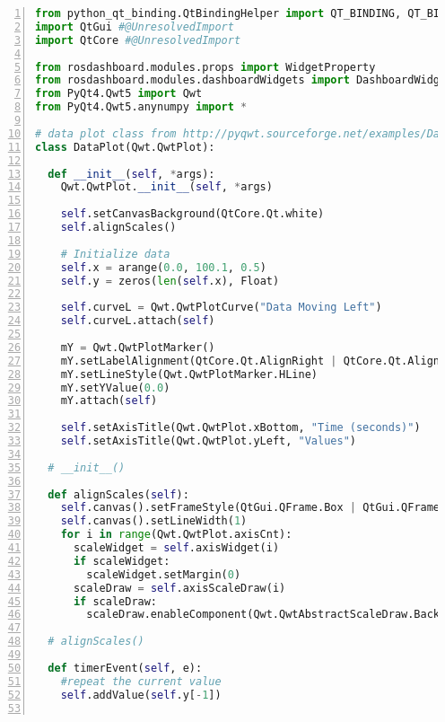 



\pagebreak
{}


\begin{lstlisting}[frame=single,caption={DragPlot implementation.},label=drag_plot_implementation,language=Python,numbers=left,breaklines=true]
from python_qt_binding.QtBindingHelper import QT_BINDING, QT_BINDING_VERSION #@UnresolvedImport @UnusedImport
import QtGui #@UnresolvedImport
import QtCore #@UnresolvedImport

from rosdashboard.modules.props import WidgetProperty
from rosdashboard.modules.dashboardWidgets import DashboardWidget
from PyQt4.Qwt5 import Qwt
from PyQt4.Qwt5.anynumpy import *

# data plot class from http://pyqwt.sourceforge.net/examples/DataDemo.py.html
class DataPlot(Qwt.QwtPlot):

  def __init__(self, *args):
    Qwt.QwtPlot.__init__(self, *args)

    self.setCanvasBackground(QtCore.Qt.white)
    self.alignScales()

    # Initialize data
    self.x = arange(0.0, 100.1, 0.5)
    self.y = zeros(len(self.x), Float)

    self.curveL = Qwt.QwtPlotCurve("Data Moving Left")
    self.curveL.attach(self)

    mY = Qwt.QwtPlotMarker()
    mY.setLabelAlignment(QtCore.Qt.AlignRight | QtCore.Qt.AlignTop)
    mY.setLineStyle(Qwt.QwtPlotMarker.HLine)
    mY.setYValue(0.0)
    mY.attach(self)

    self.setAxisTitle(Qwt.QwtPlot.xBottom, "Time (seconds)")
    self.setAxisTitle(Qwt.QwtPlot.yLeft, "Values")

  # __init__()

  def alignScales(self):
    self.canvas().setFrameStyle(QtGui.QFrame.Box | QtGui.QFrame.Plain)
    self.canvas().setLineWidth(1)
    for i in range(Qwt.QwtPlot.axisCnt):
      scaleWidget = self.axisWidget(i)
      if scaleWidget:
        scaleWidget.setMargin(0)
      scaleDraw = self.axisScaleDraw(i)
      if scaleDraw:
        scaleDraw.enableComponent(Qwt.QwtAbstractScaleDraw.Backbone, False)

  # alignScales()
  
  def timerEvent(self, e):
    #repeat the current value
    self.addValue(self.y[-1])


\end{lstlisting}
